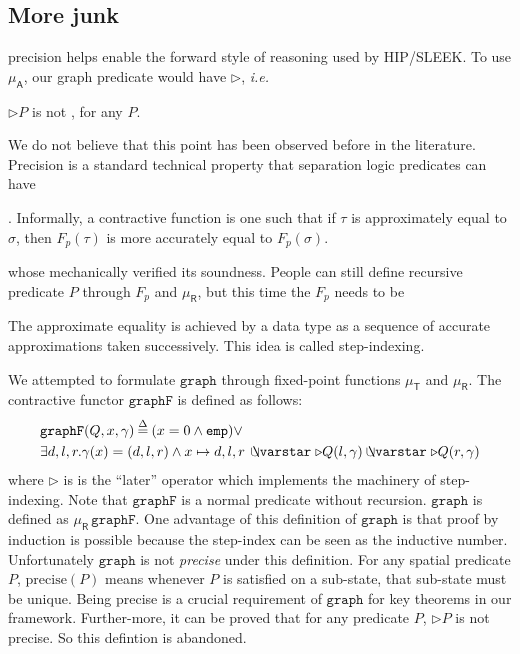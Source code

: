 \subsection{More junk}
 precision helps enable the forward style
of reasoning used by HIP/SLEEK.  To use $\mu_{\mathsf{A}}$, our graph predicate
would have $\rhd$, \emph{i.e.}


$\rhd P$ is not , for any $P$.

  We do not believe
that this point has been observed before in the literature.  Precision is a standard technical
property that separation logic predicates can have

. Informally, a contractive
function is one such that if $\tau$ is approximately equal to
$\sigma$, then $F_p(\tau)$ is more accurately equal to
$F_p(\sigma)$.


  whose
mechanically verified its soundness. People can still define recursive
predicate $P$ through $F_p$ and $\mu_{\mathsf{R}}$, but this time the
$F_p$ needs to be

 The approximate equality is achieved by a data type as
a sequence of accurate approximations taken successively. This idea is
called step-indexing.

We attempted to formulate $\mathtt{graph}$ through fixed-point
functions $\mu_{\mathsf{T}}$ and $\mu_{\mathsf{R}}$. The contractive
functor $\mathtt{graphF}$ is defined as follows:
\[\label{eqn:graphFcotr}
  \begin{split}
  & \mathtt{graphF}(Q, x, \gamma)\defeq (x = 0 \wedge \mathtt{emp})
    \vee \\ & \exists d,l,r . \gamma(x)=(d,l,r) \wedge x \mapsto
    d,l,r\, \ocon \triangleright Q(l, \gamma) \ocon \triangleright
    Q(r, \gamma)
  \end{split}
\]
where $\triangleright$ is is the ``later'' operator which implements
the machinery of step-indexing. Note that $\mathtt{graphF}$ is a
normal predicate without recursion. $\mathtt{graph}$ is defined as
$\mu_{\mathsf{R}}\,\mathtt{graphF}$. One advantage of this definition
of $\mathtt{graph}$ is that proof by induction is possible because the
step-index can be seen as the inductive number. Unfortunately
$\mathtt{graph}$ is not \emph{precise} under this definition. For any
spatial predicate $P$, $\text{precise}(P)$ means whenever $P$ is
satisfied on a sub-state, that sub-state must be unique. Being precise
is a crucial requirement of $\mathtt{graph}$ for key theorems in our
framework. Further-more, it can be proved that for any predicate $P$,
$\triangleright P$ is not precise. So this defintion is abandoned.

